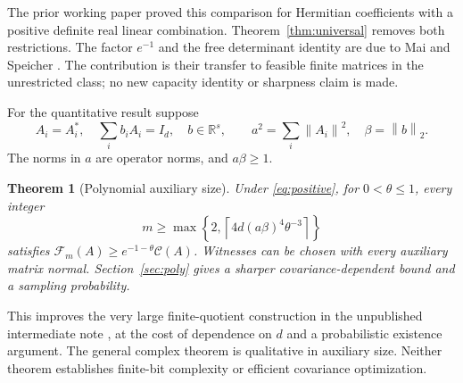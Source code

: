 \documentclass[11pt]{article}
\newtheorem{theorem}{Theorem}
\newcommand{\R}{\mathbb R}
\newcommand{\F}{\mathcal F}
\newcommand{\K}{\mathcal C}
\newcommand{\norm}[1]{\left\lVert#1\right\rVert}
\begin{document}
The prior working paper \cite{bridge} proved this comparison for Hermitian coefficients with a positive definite real linear combination. Theorem~\ref{thm:universal} removes both restrictions. The factor $e^{-1}$ and the free determinant identity are due to Mai and Speicher \cite{ms}. The contribution is their transfer to feasible finite matrices in the unrestricted class; no new capacity identity or sharpness claim is made.

For the quantitative result suppose
\begin{equation}\label{eq:positive}
 A_i=A_i^*,\quad \sum_i b_iA_i=I_d,\quad b\in\R^s,
 \qquad a^2=\sum_i\norm{A_i}^2,\quad\beta=\norm b_2.
\end{equation}
The norms in $a$ are operator norms, and $a\beta\ge1$.
\begin{theorem}[Polynomial auxiliary size]\label{thm:poly}
Under \eqref{eq:positive}, for $0<\theta\le1$, every integer
\begin{equation}\label{eq:polysize}
 m\ge\max\left\{2,\left\lceil4d(a\beta)^4\theta^{-3}\right\rceil\right\}
\end{equation}
satisfies $\F_m(A)\ge e^{-1-\theta}\K(A)$. Witnesses can be chosen with every auxiliary matrix normal. Section~\ref{sec:poly} gives a sharper covariance-dependent bound and a sampling probability.
\end{theorem}
This improves the very large finite-quotient construction in the unpublished intermediate note \cite{effective}, at the cost of dependence on $d$ and a probabilistic existence argument. The general complex theorem is qualitative in auxiliary size. Neither theorem establishes finite-bit complexity or efficient covariance optimization.
\end{document}
